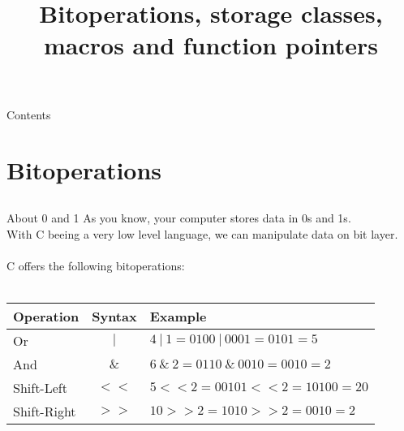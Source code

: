 
\newcommand{\topic}{
	Bitoperations, storage classes, macros and function pointers
}

\title{\topic}
\supertitle{\course}
\date{}



\maketitle

\begin{frame}{Contents}
	\tableofcontents
\end{frame}

\section{Bitoperations}
\subsection{}

\begin{frame}{About 0 and 1}
	As you know, your computer stores data in 0s and 1s.\\
	With C beeing a very low level language, we can manipulate data on bit layer.\\\ \\
	
	C offers the following bitoperations:\\\ \\
	
	\begin{tabular}{|l|c|l|}
																						  	  \hline
		\textbf{Operation} 	& \textbf{Syntax} 	& \textbf{Example} 							\\\hline
		Or 					& $|$ 				& $4\ |\ 1 = 0100\ |\ 0001 = 0101 = 5$ 		\\\hline
		And 				& $\&$ 				& $6\ \&\ 2 = 0110\ \&\ 0010 = 0010 = 2$ 	\\\hline
		Shift-Left 			& $<<$ 				& $5 << 2 = 00101 << 2 = 10100 = 20$ 		\\\hline
		Shift-Right 		& $>>$ 				& $10 >> 2 = 1010 >> 2 = 0010 = 2$ 			\\\hline
	\end{tabular}
\end{frame}

